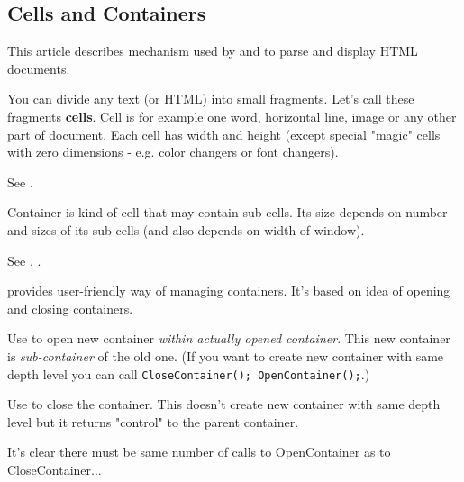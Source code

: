 \subsection{Cells and Containers}\label{cells}

This article describes mechanism used by 
 and
to parse and display HTML documents.


You can divide any text (or HTML) into small fragments. Let's call these
fragments {\bf cells}. Cell is for example one word, horizontal line, image
or any other part of document. Each cell has width and height (except special
"magic" cells with zero dimensions - e.g. color changers or font changers).

See .


Container is kind of cell that may contain sub-cells. Its size depends
on number and sizes of its sub-cells (and also depends on width of window). 

See , 
.

\begin{comment}
This image shows you cells\ &\ containers:

\image{}{contbox.bmp}
\end{comment}

 provides user-friendly way
of managing containers. It's based on idea of opening and closing containers.

Use  to open new
container {\it within actually opened container}. This new container is 
{\it sub-container} of the old one. (If you want to create new container with
same depth level you can call {\tt CloseContainer(); OpenContainer();}.)

Use  to close the 
container. This doesn't create new container with same depth level but
it returns "control" to the parent container.

\begin{comment}
See explanation:

\image{}{cont.bmp}
\end{comment}
It's clear there must be same number of calls to 
OpenContainer as to CloseContainer...

